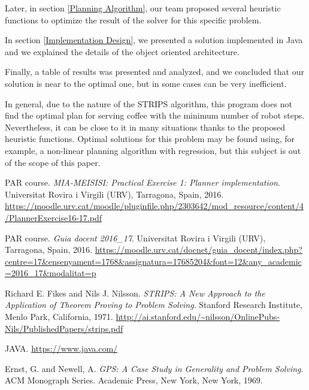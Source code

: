 \documentclass[12pt,a4paper,oneside]{article}
\numberwithin{equation}{section}
\numberwithin{equation}{section}
\theoremstyle{definition}
\begin{document}
\begin{itemize}
Later, in section \ref{Planning Algorithm}, our team proposed several heuristic functions to optimize the result of the solver for this specific problem.


In section \ref{Implementation Design},  we presented a solution implemented in Java and we explained the details of the object oriented architecture.

Finally, a table of results was presented and analyzed, and we concluded that our solution is near to the optimal one, but in some cases can be very inefficient.


In general, due to the nature of the STRIPS algorithm, this program does not find the optimal plan for serving coffee with the minimum number of robot steps. Nevertheless, it can be close to it in many situations thanks to the proposed heuristic functions. Optimal solutions for this problem may be found using, for example, a non-linear planning algorithm with regression, but this subject is out of the scope of this paper.


\newpage


\begin{thebibliography}{25}
	
	
	 PAR course. \textsl{MIA-MEISISI: Practical Exercise 1: Planner implementation}. Universitat Rovira i Virgili (URV), Tarragona, Spain, 2016. \url{https://moodle.urv.cat/moodle/pluginfile.php/2303642/mod_resource/content/4/PlannerExercise16-17.pdf}
	
	
	 PAR course. \textsl{Guia docent 2016\_17}. Universitat Rovira i Virgili (URV), Tarragona, Spain, 2016. \url{https://moodle.urv.cat/docnet/guia_docent/index.php?centre=17&ensenyament=1768&assignatura=17685204&font=12&any_academic=2016_17&modalitat=p}
	
	
	 Richard E. Fikes and Nils J. Nilsson. \textsl{STRIPS: A New Approach to the
		Application of Theorem Proving to Problem Solving}. Stanford Research Institute, Menlo Park, California, 1971. \url{http://ai.stanford.edu/~nilsson/OnlinePubs-Nils/PublishedPapers/strips.pdf}
	
	
	 JAVA. \url{https://www.java.com/}
	
	
	 Ernst, G. and Newell, A. \textsl{GPS: A Case Study in Generality and Problem Solving}. ACM Monograph Series. Academic Press, New York, New York, 1969.
	

\end{thebibliography}
\end{itemize}
\end{document}
